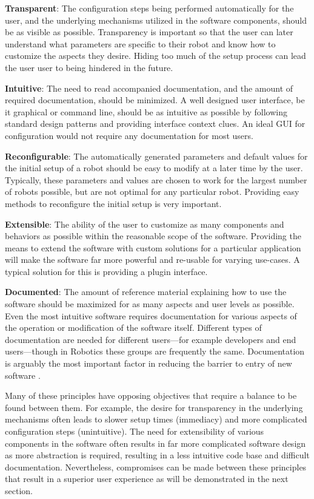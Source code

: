 \documentclass[10pt,journal,compsoc]{joser1}
\begin{document}
{{\bf Transparent}: The configuration steps being performed automatically for the user, and the underlying mechanisms utilized in the software components, should be as visible as possible. Transparency is important so that the user can later understand what parameters are specific to their robot and know how to customize the aspects they desire. Hiding too much of the setup process can lead the user user to being hindered in the future.

{\bf Intuitive}: The need to read accompanied documentation, and the amount of required documentation, should be minimized. A well designed user interface, be it graphical or command line, should be as intuitive as possible by following standard design patterns and providing interface context clues. An ideal GUI for configuration would not require any documentation for most users.

{\bf Reconfigurable}: The automatically generated parameters and default values for the initial setup of a robot should be easy to modify at a later time by the user. Typically, these parameters and values are chosen to work for the largest number of robots possible, but are not optimal for any particular robot. Providing easy methods to reconfigure the initial setup is very important.

{\bf Extensible}: The ability of the user to customize as many components and behaviors as possible within the reasonable scope of the software. Providing the means to extend the software with custom solutions for a particular application will make the software far more powerful and re-usable for varying use-cases. A typical solution for this is providing a plugin interface.

{\bf Documented}: The amount of reference material explaining how to use the software should be maximized for as many aspects and user levels as possible. Even the most intuitive software requires documentation for various aspects of the operation or modification of the software itself. Different types of documentation are needed for different users---for example developers and end users---though in Robotics these groups are frequently the same. Documentation is arguably the most important factor in reducing the barrier to entry of new software \cite{forward2002relevance}.

Many of these principles have opposing objectives that require a balance to be found between them. For example, the desire for transparency in the underlying mechanisms often leads to slower setup times (immediacy) and more complicated configuration steps (unintuitive). The need for extensibility of various components in the software often results in far more complicated software design as more abstraction is required, resulting in a less intuitive code base and difficult documentation. Nevertheless, compromises can be made between these principles that result in a superior user experience as will be demonstrated in the next section.

}
\end{document}
